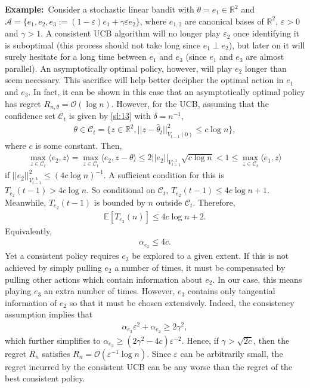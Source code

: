 \documentclass[10pt,a4article]{amsart}
\numberwithin{equation}{section}
\theoremstyle{plain}
\theoremstyle{definition}
\def\R{{\mathbb R}}
\def\E{{\mathbb E}}
\def\R{{\mathbb R}}
\def\e{{\varepsilon}}
\def\t{{\theta}}
\begin{document}
\medskip

\textbf{Example:}\ 
Consider a stochastic linear bandit with $\t=e_1\in\R^2$ and $\mathcal A=\{e_1, e_2, e_3:=(1-\e)e_1+\gamma\e e_2\}$, where $e_{1,2}$ are canonical bases of $\R^2$, $\e>0$ and $\gamma>1$. A consistent UCB algorithm will no longer play $\e_2$ once identifying it is suboptimal (this process should not take long since $e_1\perp e_2$), but later on it will surely hesitate for a long time between $e_1$ and $e_3$ (since $e_1$ and $e_3$ are almost parallel). An asymptotically optimal policy, however, will play $e_2$ longer than seem necessary. This sacrifice will help better decipher the optimal action in $e_1$ and $e_3$. In fact, it can be shown in this case that an asymptotically optimal policy has regret $R_{n,\t}=\mathcal O(\log n)$. However, for the UCB, assuming that the confidence set $\mathcal C_t$ is given by \eqref{sl:13} with $\delta = n^{-1}$, 
\begin{align*}
\t\in\mathcal C_t = \{z\in\R^2, ||z-\hat{\t}_t||^2_{V_{t-1}(0)}\leq c\log n\},
\end{align*}
where $c$ is some constant. Then,
\begin{align*}
\max_{z\in\mathcal C_t}\langle e_2, z\rangle=\max_{z\in\mathcal C_t}\langle e_2, z-\t\rangle\leq 2||e_2||_{V^{-1}_{t-1}}\sqrt{c\log n}< 1\leq \max_{z\in\mathcal C_t}\langle e_1, z\rangle 
\end{align*}
if $||e_2||^2_{V_{t-1}^{-1}}\leq (4c\log n)^{-1}$. A sufficient condition for this is $T_{e_2}(t-1)> 4c\log n$. So conditional on $\mathcal C_t$, $T_{e_2}(t-1)\leq 4c\log n + 1$. Meanwhile, $T_{e_2}(t-1)$ is bounded by $n$ outside $\mathcal C_t$. Therefore,  
\begin{align*}
\E[T_{e_2}(n)]\leq 4c\log n + 2. 
\end{align*}
Equivalently, 
\begin{align*}
\alpha_{e_2}\leq 4c. 
\end{align*}
Yet a consistent policy requires $e_2$ be explored to a given extent. If this is not achieved by simply pulling $e_2$ a number of times,  it must be compensated by pulling other actions which contain information about $e_2$. In our case, this means playing $e_3$ an extra number of times. However, $e_3$ contains only tangential information of $e_2$ so that it must be chosen extensively. Indeed, the consistency assumption implies that 
\begin{align*}
\alpha_{e_3}\e^2+\alpha_{e_2}\geq  2\gamma^2, 
\end{align*}
which further simplifies to $\alpha_{e_3}\geq (2\gamma^2-4c)\e^{-2}$. Hence, if $\gamma>\sqrt{2c}$, then the regret $R_n$ satisfies $R_n = \mathcal O(\e^{-1}\log n)$. Since $\e$ can be arbitrarily small, the regret incurred by the consistent UCB can be any worse than the regret of the best consistent policy. 




\printbibliography
 
 
\end{document}
